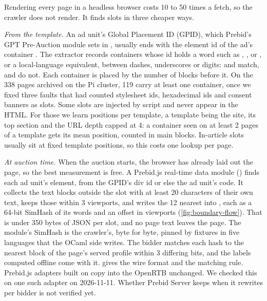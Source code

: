 Rendering every page in a headless browser costs 10 to 50 times a fetch, so the
crawler does not render. It finds slots in three cheaper ways.

\emph{From the template.} An ad unit's Global Placement ID (GPID), which
Prebid's GPT Pre-Auction module sets in , usually ends with
the element id of the ad's container \citep{prebid2026global}. The extractor
records containers whose id holds a word such as , ,
 or , or a local-language equivalent, between
dashes, underscores or digits:  and
 match,  and  do not.
Each container is placed by the number of blocks before it. On the 338 pages
archived on the Pi cluster, 119 carry at least one container, once we fixed
three faults that had counted stylesheet ids, hexadecimal ids and consent
banners as slots.
Some slots are injected by script and never appear in the HTML. For those we
learn positions per template, a template being the site, its top section and
the URL depth capped at 4: a container seen on at least 2 pages of a template
gets its mean position, counted in main blocks. In-article slots usually sit at
fixed template positions, so this costs one lookup per page.

\emph{At auction time.} When the auction starts, the browser has already laid
out the page, so the best measurement is free. A Prebid.js real-time data
module () finds each ad unit's element, from the GPID's div id
or else the ad unit's code. It collects the text blocks outside the slot with
at least 20 characters of their own text, keeps those within 3 viewports, and
writes the 12 nearest into , each as a 64-bit
SimHash of its words and an offset in viewports (\cref{fig:boundary-flow}).
That is under 350 bytes of JSON per slot, and no page text leaves the page. The
module's SimHash is the crawler's, byte for byte, pinned by fixtures in five
languages that the OCaml side writes. The bidder matches each hash to the
nearest block of the page's served profile within 3 differing bits, and the
labels computed offline come with it.  gives the wire format
and the matching rule. Prebid.js adapters built on  copy
 into the OpenRTB  unchanged. We checked this on one
such adapter on 2026-11-11. Whether Prebid Server keeps 
when it rewrites  per bidder is not verified yet.

